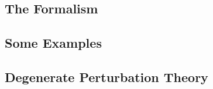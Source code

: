 \subsection{The Formalism}

\subsection{Some Examples}

\subsection{Degenerate Perturbation Theory}
